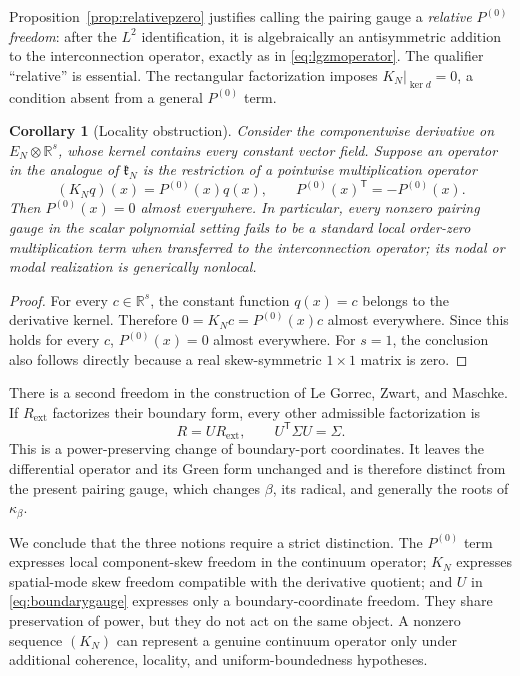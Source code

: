 \documentclass[11pt,a4paper]{article}
\newtheorem{corollary}[theorem]{Corollary}
\theoremstyle{definition}
\theoremstyle{remark}
\newcommand{\R}{\mathbb{R}}
\newcommand{\Ker}{\operatorname{ker}}
\begin{document}
Proposition~\ref{prop:relativepzero} justifies calling the pairing gauge a
\emph{relative $P^{(0)}$ freedom}: after the $L^2$ identification, it is algebraically an
antisymmetric addition to the interconnection operator, exactly as in
\eqref{eq:lgzmoperator}.  The qualifier ``relative'' is essential.  The rectangular
factorization imposes $\left.K_N\right|_{\Ker d}=0$, a condition absent from a general
$P^{(0)}$ term.

\begin{corollary}[Locality obstruction]\label{cor:p0locality}
Consider the componentwise derivative on
$E_N\otimes\R^s$, whose kernel contains every constant vector field.  Suppose an operator in
the analogue of $\mathfrak k_N$ is the restriction of a pointwise multiplication operator
\begin{equation}\label{eq:localp0}
 (K_Nq)(x)=P^{(0)}(x)q(x),
 \qquad P^{(0)}(x)^{\mathsf T}=-P^{(0)}(x).
\end{equation}
Then $P^{(0)}(x)=0$ almost everywhere.  In particular, every nonzero pairing gauge in the
scalar polynomial setting fails to be a standard local order-zero multiplication term when
transferred to the interconnection operator; its nodal or modal realization is generically
nonlocal.
\end{corollary}

\begin{proof}
For every $c\in\R^s$, the constant function $q(x)=c$ belongs to the derivative kernel.
Therefore $0=K_Nc=P^{(0)}(x)c$ almost everywhere.  Since this holds for every $c$,
$P^{(0)}(x)=0$ almost everywhere.  For $s=1$, the conclusion also follows directly because a
real skew-symmetric $1\times1$ matrix is zero.
\end{proof}

There is a second freedom in the construction of Le Gorrec, Zwart, and Maschke.  If
$R_{\mathrm{ext}}$ factorizes their boundary form, every other admissible factorization is
\begin{equation}\label{eq:boundarygauge}
 R=UR_{\mathrm{ext}},
 \qquad U^{\mathsf T}\Sigma U=\Sigma.
\end{equation}
This is a power-preserving change of boundary-port coordinates.  It leaves the differential
operator and its Green form unchanged and is therefore distinct from the present pairing
gauge, which changes $\beta$, its radical, and generally the roots of $\kappa_\beta$.

We conclude that the three notions require a strict distinction.  The $P^{(0)}$ term expresses
local component-skew freedom in the continuum operator; $K_N$ expresses spatial-mode skew
freedom compatible with the derivative quotient; and $U$ in \eqref{eq:boundarygauge}
expresses only a boundary-coordinate freedom.  They share preservation of power, but they do
not act on the same object.  A nonzero sequence $(K_N)$ can represent a genuine continuum
operator only under additional coherence, locality, and uniform-boundedness hypotheses.
\end{document}
